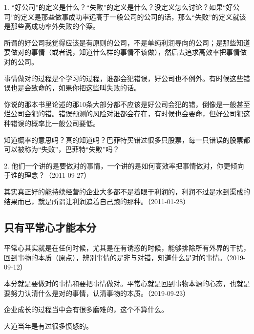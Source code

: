 1. “好公司”的定义是什么？“失败”的定义是什么？没定义怎么讨论？如果“好公司”的定义是那些做事成功率远高于一般公司的公司的话，那么“失败”的定义就该是那些高成功率外失败的个案。

所谓的好公司我觉得应该是有原则的公司，不是单纯利润导向的公司；是那些知道要做对的事情（或者说，知道什么样的事情不该做），然后去追求高效率把事情做对的公司。

事情做对的过程是个学习的过程，谁都会犯错误，好公司也不例外。有时候这些错误也是会致命的，如果你把这些叫失败的话。

你说的那本书里论述的那10条大部分都不应该是好公司会犯的错，倒像是一般甚至烂公司会犯的错。错误预测的风险对谁都会存在，有时候也会要命，但好公司犯这种错误的概率比一般公司要低。

知道概率的意思吗？真的知道吗？巴菲特买错过很多只股票，每一只错误的股票都可以被称为“失败”，巴菲特“失败”吗？

2. 他们一个讲的是要做对的事情，一个讲的是如何高效率把事情做对，你更倾向于谁的理念？（2011-09-27）


其实真正好的能持续经营的企业大多都不是着眼于利润的，利润不过是水到渠成的结果而已，就是所谓让利润追着自己跑的那种。（2011-01-28）

\subsection{只有平常心才能本分}

平常心其实就是在任何时候，尤其是在有诱惑的时候，能够排除所有外界的干扰，回到事物的本质（原点），辨别事情的是非与对错，知道什么是对的事情。（2019-09-12）


本分就是要做对的事情和要把事情做对。平常心就是回到事物本源的心态，也就是要努力认清什么是对的事情，认清事物的本质。（2019-09-23）


企业成长的过程当中会有很多磨难的，这个不算什么。


大道当年是有过很多愤怒的。


